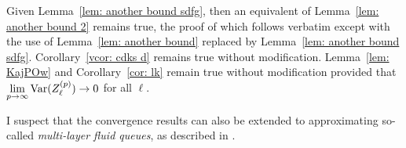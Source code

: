 Given Lemma~\ref{lem: another bound sdfg}, then an equivalent of Lemma~\ref{lem: another bound 2} remains true, the proof of which follows verbatim except with the use of Lemma~\ref{lem: another bound} replaced by Lemma~\ref{lem: another bound sdfg}. Corollary~\ref{vcor: cdks d} remains true without modification. Lemma~\ref{lem: KajPOw} and Corollary~\ref{cor: lk} remain true without modification provided that \(\lim\limits_{p\to\infty}\mathrm{Var}(Z_\ell^{(p)})\to 0\) for all \(\ell\). 

\begin{rem}
	I suspect that the convergence results can also be extended to approximating so-called \emph{multi-layer fluid queues}, as described in \cite{bo2008}. 
\end{rem}































